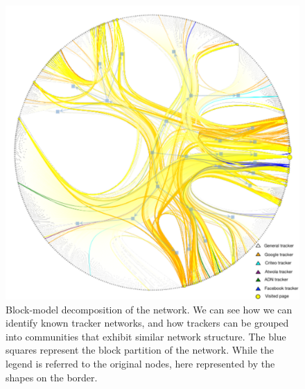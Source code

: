 \begin{figure}
\includegraphics[width=\textwidth]{figures/blockmodel.pdf}
\caption[Blockmodel decomposition of the tracker network]{Block-model decomposition of the network. We can see how we can identify known tracker networks, and how trackers can be grouped into communities that exhibit similar network structure. The blue squares represent the block partition of the network. While the legend is referred to the original nodes, here represented by the shapes on the border.}
\label{fig:blockmodel}
\end{figure}

